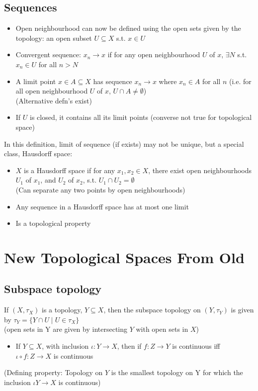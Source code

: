 \subsection*{Sequences}
\begin{itemize}
    \item Open neighbourhood can now be defined using the open sets given by the topology: an open subset $U \subseteq X$ s.t. $x \in U$
    \item Convergent sequence: $x_n \to x$ if for any open neighbourhood $U$ of $x$, $\exists N$ s.t. $x_n \in U$ for all $n > N$
    \item A limit point $x \in A \subseteq X$ has sequence $x_n \to x$ where $x_n \in A$ for all $n$ (i.e. for all open neighbourhood $U$ of $x$, $U \cap A \neq \emptyset$)\\ (Alternative defn's exist)
    \item If $U$ is closed, it contains all its limit points (converse not true for topological space)
\end{itemize}

In this definition, limit of sequence (if exists) may not be unique, but a special class, Hausdorff space:
\begin{itemize}
    \item $X$ is a Hausdorff space if for any $x_1, x_2 \in X$, there exist open neighbourhoods $U_1$ of $x_1$, and $U_2$ of $x_2$, s.t. $U_1 \cap U_2 = \emptyset$\\
          (Can separate any two points by open neighbourhoods)
    \item Any sequence in a Hausdorff space has at most one limit
    \item Is a topological property
\end{itemize}

\section{New Topological Spaces From Old}
\subsection*{Subspace topology}
If $(X,\tau_X)$ is a topology, $Y \subseteq X$, then the subspace topology on $(Y,\tau_Y)$ is given by $\tau_Y = \{ Y \cap U \mid U \in \tau_X \}$ \\ (open sets in Y are given by intersecting $Y$ with open sets in $X$)
\begin{itemize}
    \item If $Y \subseteq X$, with inclusion $\iota: Y \to X$, then if $f: Z \to Y$ is continuous iff $\iota \circ f: Z \to X$ is continuous
\end{itemize}
(Defining property: Topology on $Y$ is the smallest topology on Y for which the inclusion $\iota Y \to X$ is continuous)


